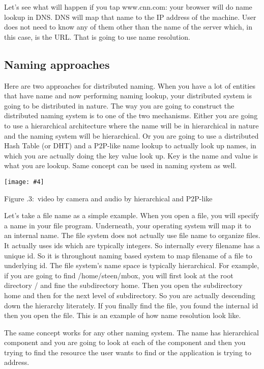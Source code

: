 \documentclass[twoside]{article}
\newcounter{lecnum}
\newcommand{\fig}[4]{
            \centerline{\texttt{[image: \#4]}}
            \begin{center}
            Figure \thelecnum.#1:~#3
            \end{center}
    }
\begin{document}
Let’s see what will happen if you tap www.cnn.com: your browser will do name lookup in DNS. DNS will map that name to the IP address of the machine. User does not need to know any of them other than the name of the server which, in this case, is the URL. That is going to use name resolution.

\subsection{Naming approaches}
Here are two approaches for distributed naming. When you have a lot of entities that have name and now performing naming lookup, your distributed system is going to be distributed in nature. The way you are going to construct the distributed naming system is to one of the two mechanisms. Either you are going to use a hierarchical architecture where the name will be in hierarchical in nature and the naming system will be hierarchical. Or you are going to use a distributed Hash Table (or DHT) and a P2P-like name lookup to actually look up names, in which you are actually doing the key value look up. Key is the name and value is what you are lookup. Same concept can be used in naming system as well.

 \fig{3}{0.4}{video by camera and audio by hierarchical and P2P-like}{hierarchical.png}
 
Let’s take a file name as a simple example. When you open a file, you will specify a name in your file program. Underneath, your operating system will map it to an internal name. The file system does not actually use file name to organize files. It actually uses ids which are typically integers. So internally every filename has a unique id. So it is throughout naming based system to map filename of a file to underlying id. The file system’s name space is typically hierarchical. For example, if you are going to find /home/steen/mbox, you will first look at the root directory / and fine the subdirectory home. Then you open the subdirectory home and then for the next level of subdirectory. So you are actually descending down the hierarchy literately. If you finally find the file, you found the internal id then you open the file. This is an example of how name resolution look like.

The same concept works for any other naming system. The name has hierarchical component and you are going to look at each of the component and then you trying to find the resource the user wants to find or the application is trying to address.
\end{document}
